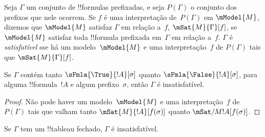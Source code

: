 \documentclass[../../../include/open-logic-section]{subfiles}
\begin{document}
\begin{defn}
  Seja $\Gamma$ um conjunto de !!{formula}s prefixadas, e seja
  $P(\Gamma)$ o conjunto dos prefixos que nele ocorrem. Se $f$ é uma
  interpretação de~$P(\Gamma)$ em $\mModel{M}$, dizemos que $\mModel{M}$
  satisfaz $\Gamma$ em relação a~$f$, $\mSat{M}{\Gamma}[f]$, se
  $\mModel{M}$ satisfaz toda !!{formula} prefixada em~$\Gamma$ em relação
  a~$f$. $\Gamma$ é \emph{satisfatível} sse há um modelo~$\mModel{M}$ e
  uma interpretação~$f$ de $P(\Gamma)$ tais que
  $\mSat{M}{\Gamma}[f]$.
\end{defn}

\begin{prop}
  Se $\Gamma$ contém tanto $\sFmla{\True}{!A}[\sigma]$ quanto
  $\sFmla{\False}{!A}[\sigma]$, para alguma !!{formula}~$!A$ e algum
  prefixo~$\sigma$, então $\Gamma$ é insatisfatível.
\end{prop}

\begin{proof}
  Não pode haver um modelo~$\mModel{M}$ e uma interpretação~$f$ de
  $P(\Gamma)$ tais que valham tanto $\mSat{M}{!A}[f(\sigma)]$ quanto
  $\mSat/{M}{!A}[f(\sigma)]$.
\end{proof}

\begin{thm}[Correção]
  Se $\Gamma$ tem um !!{tableau} fechado, $\Gamma$ é insatisfatível.
\end{thm}
\end{document}
